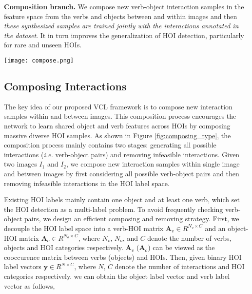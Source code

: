 \documentclass[runningheads]{llncs}
\newcommand{\ie}{\textit{i.e. }}
\begin{document}
\textbf{Composition branch.} We compose new verb-object interaction samples in the feature space from the verbs and objects between and within images and then \textit{these synthesized samples are trained jointly with the interactions annotated in the dataset}. It in turn improves the generalization of HOI detection, particularly for rare and unseen HOIs.



\begin{figure*}[t]
\begin{center}
\texttt{[image: compose.png]}
\end{center}
   \caption{Illustration of the process of composing new interactions. Given two images $I_1$ and $I_2$, we compose new interaction samples within single image and between them by first considering all possible verb-object pairs and then removing infeasible interactions}
\label{fig:composing_type}
\end{figure*}

\subsection{Composing Interactions}
The key idea of our proposed VCL framework is to compose new interaction samples within and between images. This composition process encourages the network to learn shared object and verb features across HOIs by composing massive diverse HOI samples. As shown in Figure \ref{fig:composing_type}, the composition process mainly contains two stages: generating all possible interactions (\ie verb-object pairs) and removing infeasible interactions.
Given two images $I_1$ and $I_2$, we compose new interaction samples within single image and between images by first considering all possible verb-object pairs and then removing infeasible interactions in the HOI label space.

Existing HOI labels mainly contain one object and at least one verb, which set the HOI detection as a multi-label problem. To avoid frequently checking verb-object pairs, we design an efficient composing and removing strategy. First, we decouple the HOI label space into a verb-HOI  matrix $\mathbf{A}_v\in R^{N_v\times C}$ and an object-HOI matrix $\mathbf{A}_o\in R^{N_o\times C}$, where $N_v$, $N_o$, and $C$ denote the number of verbs, objects and HOI categories respectively. $\mathbf{A}_v$ ($\mathbf{A}_o$) can be viewed as the cooccurence matrix between verbs (objects) and HOIs. Then, given binary HOI label vectors $\mathbf{y} \in R^{N \times C}$, where $N$, $C$ denote the number of interactions and HOI categories respectively. we can obtain the object label vector and verb label vector as follows,
\end{document}
